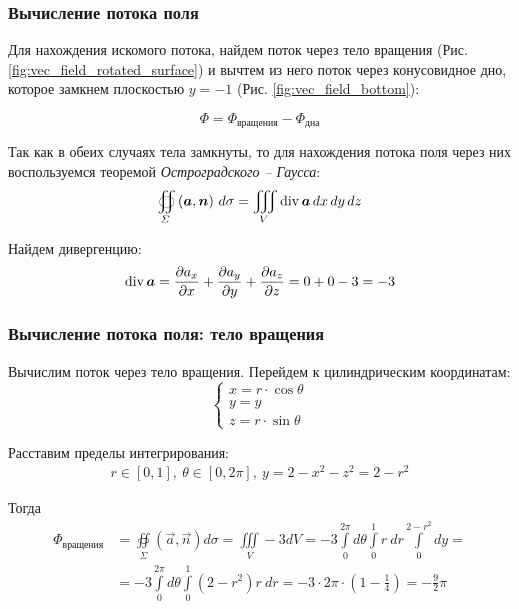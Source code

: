 \begin{frame}\frametitle{Вычисление потока поля}
	Для нахождения искомого потока, найдем поток через тело вращения
	(Рис. \ref{fig:vec_field_rotated_surface}) и вычтем из него поток
	через конусовидное дно, которое замкнем плоскостью \(y = -1\) (Рис. \ref{fig:vec_field_bottom}):

	\begin{equation*}
		\Phi = \Phi_{\text{вращения}} - \Phi_{\text{дна}}
	\end{equation*}

	Так как в обеих случаях тела замкнуты, то для нахождения
	потока поля через них воспользуемся теоремой \textit{Остроградского -- Гаусса}:
	\begin{equation*}
		\oiint\limits_{\Sigma}\left( \vec {a}, \vec {n} \right) \, d\sigma = \iiint\limits_V \Div \vec {a} \, dx \, dy \, dz
	\end{equation*}

	Найдем дивергенцию:
	\begin{equation*}
		\Div \vec a = \frac{\partial a_x}{\partial x} +  \frac{\partial a_y}{\partial y} +  \frac{\partial a_z}{\partial z} = 0 + 0 - 3 = -3
	\end{equation*}
\end{frame}

\begin{frame}\frametitle{Вычисление потока поля: тело вращения}
	Вычислим поток через тело вращения.
	Перейдем к цилиндрическим координатам:
	\begin{equation*}
		\begin{cases}
			x = r \cdot \cos \theta \\
			y = y                   \\
			z = r \cdot \sin \theta
		\end{cases}
	\end{equation*}

	Расставим пределы интегрирования:
	\begin{align*}
		r \in [0, 1], \
		\theta \in [0, 2\pi], \
		y = 2 - x^2 - z^2 = 2 - r^2
	\end{align*}

	Тогда
	\begin{align*}
		\Phi_{\text{вращения}} & = \oiint\limits_{\Sigma}\left( \vec {a}, \vec {n} \right) d\sigma = \iiint\limits_V -3 dV
		= -3 \int\limits_{0}^{2 \pi} d \theta
		\int\limits_{0}^{1} r~dr
		\int\limits_{0}^{2-r^2} dy =                                                                                       \\
		                       & = -3 \int\limits_{0}^{2 \pi} d \theta
		\int\limits_{0}^{1} (2-r^2)r~dr
		= -3 \cdot 2 \pi \cdot
		\left(1 - \frac{1}{4}\right)
		= - \frac{9}{2}\pi
	\end{align*}
\end{frame}

